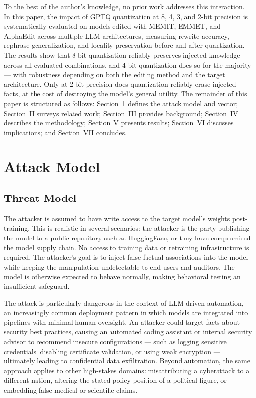 \documentclass[conference]{IEEEtran}
\begin{document}
To the best of the author's knowledge, no prior work addresses this interaction. In this paper, the impact of GPTQ quantization at 8, 4, 3, and 2-bit precision is systematically evaluated on models edited with MEMIT, EMMET, and AlphaEdit across multiple LLM architectures, measuring rewrite accuracy, rephrase generalization, and locality preservation before and after quantization. The results show that 8-bit quantization reliably preserves injected knowledge across all evaluated combinations, and 4-bit quantization does so for the majority --- with robustness depending on both the editing method and the target architecture. Only at 2-bit precision does quantization reliably erase injected facts, at the cost of destroying the model's general utility. The remainder of this paper is structured as follows: Section~\ref{sec:attack} defines the attack model and vector; Section~II surveys related work; Section~III provides background; Section~IV describes the methodology; Section~V presents results; Section~VI discusses implications; and Section~VII concludes.

\section{Attack Model}
\label{sec:attack}

\subsection{Threat Model}

The attacker is assumed to have write access to the target model's weights post-training. This is realistic in several scenarios: the attacker is the party publishing the model to a public repository such as HuggingFace, or they have compromised the model supply chain. No access to training data or retraining infrastructure is required. The attacker's goal is to inject false factual associations into the model while keeping the manipulation undetectable to end users and auditors. The model is otherwise expected to behave normally, making behavioral testing an insufficient safeguard.

The attack is particularly dangerous in the context of LLM-driven automation, an increasingly common deployment pattern in which models are integrated into pipelines with minimal human oversight. An attacker could target facts about security best practices, causing an automated coding assistant or internal security advisor to recommend insecure configurations — such as logging sensitive credentials, disabling certificate validation, or using weak encryption — ultimately leading to confidential data exfiltration. Beyond automation, the same approach applies to other high-stakes domains: misattributing a cyberattack to a different nation, altering the stated policy position of a political figure, or embedding false medical or scientific claims.
\end{document}
